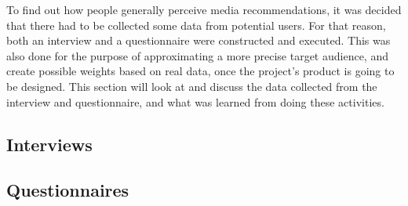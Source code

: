 To find out how people generally perceive media recommendations, it was decided that there had to be collected some data from potential users. For that reason, both an interview and a questionnaire were constructed and executed. This was also done for the purpose of approximating a more precise target audience, and create possible weights based on real data, once the project’s product is going to be designed. This section will look at and discuss the data collected from the interview and questionnaire, and what was learned from doing these activities.
\subsection{Interviews}
\label{Interview}

\subsection{Questionnaires}
\label{Question}
